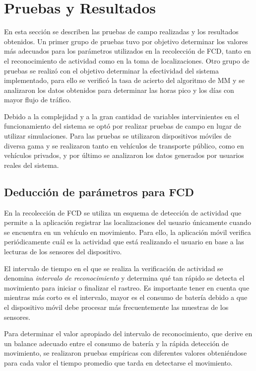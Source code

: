 \section{Pruebas y Resultados}
\label{sec:pruebas}

En esta sección se describen las pruebas de campo realizadas y los resultados obtenidos. Un primer grupo de pruebas tuvo por objetivo determinar los valores más adecuados para los parámetros utilizados en la recolección de FCD, tanto en el reconocimiento de actividad como en la toma de localizaciones. Otro grupo de pruebas se realizó con el objetivo determinar la efectividad del sistema implementado, para ello se verificó la tasa de acierto del algoritmo de MM y se analizaron los datos obtenidos para determinar las horas pico y los días con mayor flujo de tráfico.

Debido a la complejidad y a la gran cantidad de variables intervinientes en el funcionamiento del sistema se optó por realizar pruebas de campo en lugar de utilizar simulaciones. Para las pruebas se utilizaron dispositivos móviles de diversa gama y se realizaron tanto en vehículos de transporte público, como en vehículos privados, y por último se analizaron los datos generados por usuarios reales del sistema. 

\subsection{Deducción de parámetros para FCD}

En la recolección de FCD se utiliza un esquema de detección de actividad que permite a la aplicación registrar las localizaciones del usuario únicamente cuando se encuentra en un vehículo en movimiento. Para ello, la aplicación móvil verifica periódicamente cuál es la actividad que está realizando el usuario en base a las lecturas de los sensores del dispositivo. 

El intervalo de tiempo en el que se realiza la verificación de actividad se denomina \emph{intervalo de reconocimiento} y determina qué tan rápido se detecta el movimiento para iniciar o finalizar el rastreo. Es importante tener en cuenta que mientras más corto es el intervalo, mayor es el consumo de batería debido a que el dispositivo móvil debe procesar más frecuentemente las muestras de los sensores. 

Para determinar el valor apropiado del intervalo de reconocimiento, que derive en un balance adecuado entre el consumo de batería y la rápida detección de movimiento, se realizaron pruebas empíricas con diferentes valores obteniéndose para cada valor el tiempo promedio que tarda en detectarse el movimiento. 

